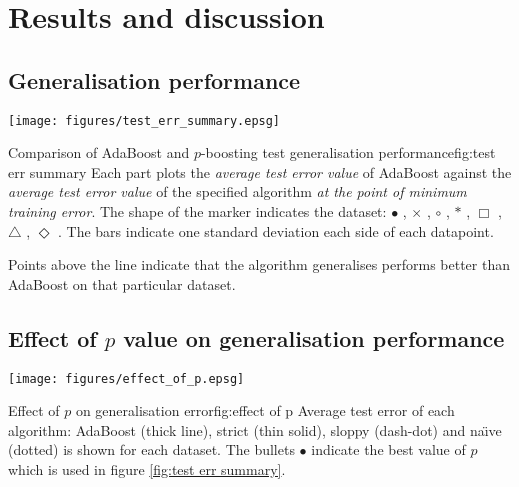 
\chapter{Results and discussion}
\label{chapter:results}

\section{Generalisation performance}

\begin{linefigure}
\begin{center}
\texttt{[image: figures/test\_err\_summary.epsg]}
\end{center}
\begin{capt}{Comparison of AdaBoost and $p$-boosting test
generalisation performance}{fig:test err summary}
Each part plots the \emph{average test error value} of AdaBoost
against the \emph{average test error value} of the specified algorithm
\emph{at the point of minimum training error}.  The shape of the
marker indicates the dataset: $\bullet$ , $\times$
, $\circ$ , $\ast$ , $\Box$
, $\bigtriangleup$ , $\Diamond$ .  The
bars indicate one standard deviation each side of each datapoint.

Points above the line indicate that the algorithm generalises performs
better than AdaBoost on that particular dataset.
\end{capt}
\end{linefigure}


\section{Effect of $p$ value on generalisation performance}

\begin{linefigure}
\begin{center}
\texttt{[image: figures/effect\_of\_p.epsg]}
\end{center}
\begin{capt}{Effect of $p$ on generalisation error}{fig:effect of p}
Average test error of each algorithm: AdaBoost (thick line), strict
(thin solid), sloppy (dash-dot) and na\"{\i}ve (dotted) is shown for
each dataset.  The bullets $\bullet$ indicate the best value of $p$
which is used in figure \ref{fig:test err summary}.
\end{capt}
\end{linefigure}

